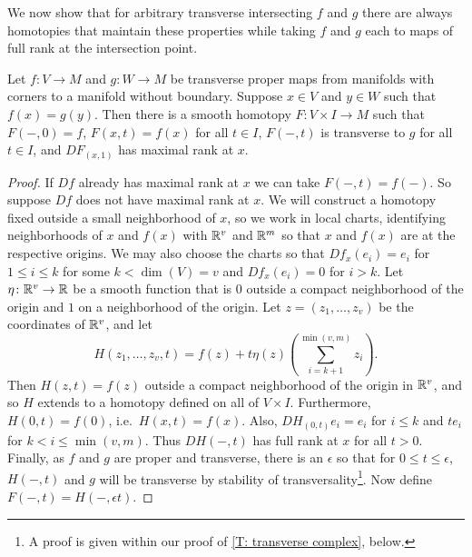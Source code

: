 We now show that for arbitrary transverse intersecting $f$ and $g$ there are always homotopies that maintain these properties while taking $f$ and $g$ each to maps of full rank at the intersection point.

\begin{lemma}\label{L: make full}
	Let $f \colon V \to M$ and $g \colon W \to M$ be transverse proper maps from manifolds with corners to a manifold without boundary.
	Suppose $x \in V$ and $y \in W$ such that $f(x) = g(y)$.
	Then there is a smooth homotopy $F \colon V \times I \to M$ such that $F(-,0) = f$, $F(x,t) = f(x)$ for all $t \in I$, $F(-,t)$ is transverse to $g$ for all $t \in I$, and $DF_{(x,1)}$ has maximal rank at $x$.
\end{lemma}

\begin{proof}
	If $Df$ already has maximal rank at $x$ we can take $F(-,t) = f(-)$.
	So suppose $Df$ does not have maximal rank at $x$.
	We will construct a homotopy fixed outside a small neighborhood of $x$, so we work in local charts, identifying neighborhoods of $x$ and $f(x)$ with $\mathbb{R}^v$ and $\mathbb{R}^m$ so that $x$ and $f(x)$ are at the respective origins.
	We may also choose the charts so that $Df_x(e_i) = e_i$ for $1 \leq i \leq k$ for some $k<\dim(V) = v$ and $Df_x(e_i) = 0$ for $i>k$.
	Let $\eta \colon \mathbb{R}^v \to \mathbb{R}$ be a smooth function that is $0$ outside a compact neighborhood of the origin and $1$ on a neighborhood of the origin.
	Let $z = (z_1,\ldots,z_v)$ be the coordinates of $\mathbb{R}^v$, and let
	$$H(z_1,\ldots,z_v,t) = f(z) + t\eta(z)\left(\sum_{i = k+1}^{\min(v,m)} z_i\right).$$
	Then $H(z,t) = f(z)$ outside a compact neighborhood of the origin in $\mathbb{R}^v$, and so $H$ extends to a homotopy defined on all of $V \times I$.
	Furthermore, $H(0,t) = f(0)$, i.e.\ $H(x,t) = f(x)$.
	Also,
	$DH_{(0,t)}e_i = e_i$ for $i \leq k$ and $te_i$ for $k<i \leq \min(v,m)$.
	Thus $DH(-,t)$ has full rank at $x$ for all $t>0$.
	Finally, as $f$ and $g$ are proper and transverse, there is an $\epsilon$ so that for $0 \leq t \leq \epsilon$, $H(-,t)$ and $g$ will be transverse by stability of transversality\footnote{A proof is given within our proof of \cref{T: transverse complex}, below.}.
	Now define $F(-,t) = H(-,\epsilon t)$.
\end{proof}

